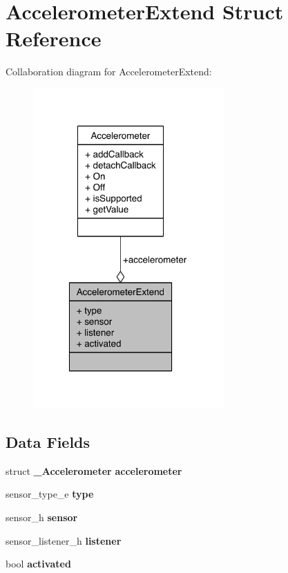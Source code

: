 \section{Accelerometer\-Extend Struct Reference}
\label{structAccelerometerExtend}


Collaboration diagram for Accelerometer\-Extend\-:\nopagebreak
\begin{figure}[H]
\begin{center}
\leavevmode
\includegraphics[width=207pt]{structAccelerometerExtend__coll__graph}
\end{center}
\end{figure}
\subsection*{Data Fields}
\begin{DoxyCompactItemize}
\item 
struct {\bf \-\_\-\-Accelerometer} {\bfseries accelerometer}\label{structAccelerometerExtend_addfd04f65f7a21730f53f90e13955920}

\item 
sensor\-\_\-type\-\_\-e {\bfseries type}\label{structAccelerometerExtend_ae3f12d84515d2ef72144e3f48f52c61e}

\item 
sensor\-\_\-h {\bfseries sensor}\label{structAccelerometerExtend_afe886ad3297c36350ddb98f7b9260493}

\item 
sensor\-\_\-listener\-\_\-h {\bfseries listener}\label{structAccelerometerExtend_a5d89932570057de945341e8948cd0856}

\item 
bool {\bfseries activated}\label{structAccelerometerExtend_ab735c16bb823f44f6e6354741c16b386}

\end{DoxyCompactItemize}


